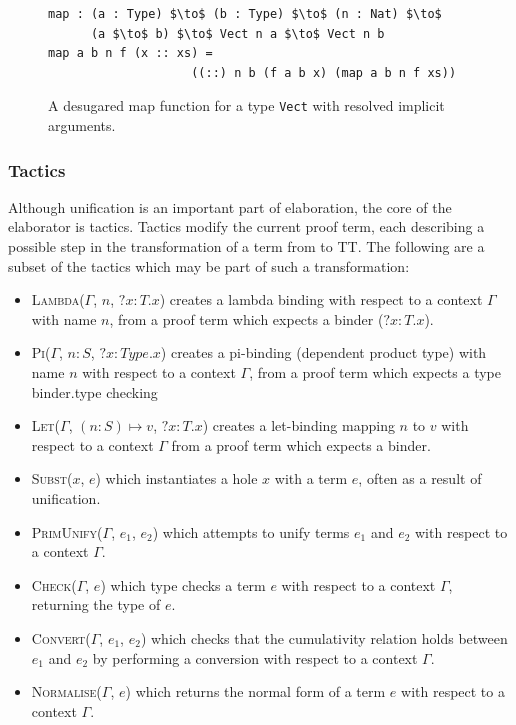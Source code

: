 \begin{figure}
\begin{lstlisting}[mathescape]
map : (a : Type) $\to$ (b : Type) $\to$ (n : Nat) $\to$ 
      (a $\to$ b) $\to$ Vect n a $\to$ Vect n b
map a b n f (x :: xs) = 
                    ((::) n b (f a b x) (map a b n f xs))
\end{lstlisting}
  \caption{A desugared map function for a type \texttt{Vect} with resolved
    implicit arguments.}
  \label{fig:vect_map_resolved}
\end{figure}

\subsubsection{Tactics}
Although unification is an important part of elaboration, the core of the
elaborator is tactics. Tactics modify the current proof term, each describing a
possible step in the transformation of a term from \IdrisM{} to TT. The following
are a subset of the tactics which may be part of such a transformation: 

\begin{itemize}
\item \textsc{Lambda($\Gamma$, $n$, $?x:T.x$)} creates a lambda binding with
  respect to a context $\Gamma$ with name $n$, from a proof term which
  expects a binder ($?x:T.x$).
\item \textsc{Pi($\Gamma$, $n:S$, $?x:Type.x$)} creates a pi-binding (dependent
  product type) with name $n$ with respect to a context $\Gamma$, from a
  proof term which expects a type binder.type checking
\item \textsc{Let($\Gamma$, $(n:S) \mapsto v$, $?x:T.x$)} creates a let-binding
  mapping $n$ to $v$ with respect to a context $\Gamma$ from a
  proof term which expects a binder.
\item \textsc{Subst($x$, $e$)} which instantiates a hole $x$ with a term
  $e$, often as a result of unification.
\item \textsc{PrimUnify($\Gamma$, $e_{1}$, $e_{2}$)} which attempts to unify terms
  $e_{1}$ and $e_{2}$ with respect to a context $\Gamma$. 
\item \textsc{Check($\Gamma$, $e$)} which type checks a term $e$ with
  respect to a context $\Gamma$, returning the type of $e$.
\item \textsc{Convert($\Gamma$, $e_{1}$, $e_{2}$)} which checks that the
  cumulativity relation holds between $e_{1}$ and $e_{2}$ by performing a
  conversion with respect to a context $\Gamma$. 
\item \textsc{Normalise($\Gamma$, $e$)} which returns the normal form of a term
  $e$ with respect to a context $\Gamma$.
\end{itemize}

